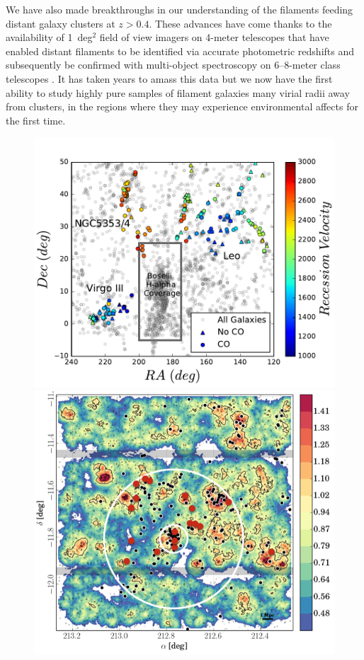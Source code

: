 \documentclass[11pt]{article}
\begin{document}
We have also made breakthroughs in our understanding of the filaments feeding distant galaxy clusters at $z>0.4$.  These advances have come thanks to the availability of 1~deg$^{2}$ field of view imagers on 4-meter telescopes that have enabled distant filaments to be identified via accurate photometric redshifts and subsequently be confirmed with multi-object spectroscopy on 6--8-meter class telescopes \citep[Fig. 1;][]{Rerat17}.  It has taken years to amass this data but we now have the first ability to study highly pure samples of filament galaxies many virial radii away from clusters, in the regions where they may experience environmental affects for the first time.

\begin{figure}
\vspace{-1cm}
\begin{minipage}{.5\textwidth}
  \centering
  \includegraphics[width=0.9\linewidth]{filaments-for-issi-prop.pdf}
\end{minipage}%
\begin{minipage}{.5\textwidth}
  \centering
  \includegraphics[width=.8\linewidth]{seediscs_filament_with_alma.png}

\end{minipage}
\end{figure}
\end{document}
